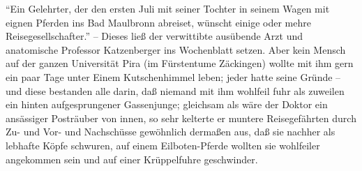 \documentclass[11pt]{book}
\begin{document}
\beginnumbering
\pstart
``Ein Gelehrter, der den ersten Juli mit seiner Tochter in seinem Wagen mit eignen Pferden ins Bad Maulbronn abreiset, wünscht einige oder mehre Reisegesellschafter.'' -- Dieses ließ der verwittibte ausübende Arzt und anatomische Professor Katzenberger ins Wochenblatt setzen. Aber kein Mensch auf der ganzen Universität Pira (im Fürstentume Zäckingen) wollte mit ihm gern ein paar Tage unter Einem Kutschenhimmel leben; jeder hatte seine Gründe – und diese bestanden alle darin, daß niemand mit ihm wohlfeil fuhr als zuweilen ein hinten aufgesprungener Gassenjunge; gleichsam als wäre der Doktor ein ansässiger Posträuber von innen, so sehr kelterte er muntere Reisegefährten durch Zu- und Vor- und Nachschüsse gewöhnlich dermaßen aus, daß sie nachher als lebhafte Köpfe schwuren, auf einem Eilboten-Pferde wollten sie wohlfeiler angekommen sein und auf einer Krüppelfuhre geschwinder.
\pend
\endnumbering
\end{document}
